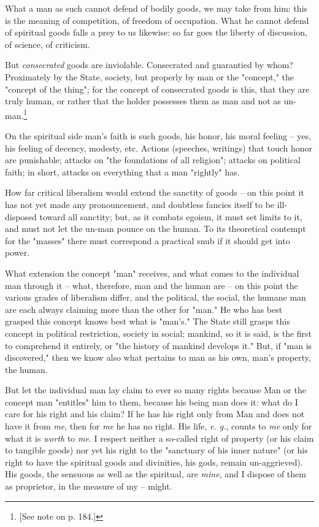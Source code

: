 What a man as such cannot defend of bodily goods, we may take from him: this 
is the meaning of competition, of freedom of occupation. What he cannot defend 
of spiritual goods falls a prey to us likewise: so far goes the liberty of 
discussion, of science, of criticism.

But \textit{consecrated} goods are inviolable. Consecrated and guarantied by 
whom? Proximately by the State, society, but properly by man or the 
"{}concept,"{} the "{}concept of the thing"{}; for the concept of consecrated 
goods is this, that they are truly human, or rather that the holder possesses 
them as man and not as un-man.\footnote{[See note on p. 184.]}

On the spiritual side man's faith is such goods, his honor, his moral feeling 
-- yes, his feeling of decency, modesty, etc. Actions (speeches, writings) 
that touch honor are punishable; attacks on "{}the foundations of all 
religion"{}; attacks on political faith; in short, attacks on everything that 
a man "{}rightly"{} has.

How far critical liberalism would extend the sanctity of goods -- on this 
point it has not yet made any pronouncement, and doubtless fancies itself to 
be ill-disposed toward all sanctity; but, as it combats egoism, it must set 
limits to it, and must not let the un-man pounce on the human. To its 
theoretical contempt for the "{}masses"{} there must correspond a practical 
snub if it should get into power.

What extension the concept "{}man"{} receives, and what comes to the 
individual man through it -- what, therefore, man and the human are -- on this 
point the various grades of liberalism differ, and the political, the social, 
the humane man are each always claiming more than the other for "{}man."{} He 
who has best grasped this concept knows best what is "{}man's."{} The State 
still grasps this concept in political restriction, society in social; 
mankind, so it is said, is the first to comprehend it entirely, or "{}the 
history of mankind develops it."{} But, if "{}man is discovered,"{} then we 
know also what pertains to man as his own, man's property, the human.

But let the individual man lay claim to ever so many rights because Man or the 
concept man "{}entitles"{} him to them, because his being man does it: what do 
I care for his right and his claim? If he has his right only from Man and does 
not have it from \textit{me}, then for \textit{me} he has no right. His life, 
\textit{e. g.}, counts to \textit{me} only for what it is \textit{worth} to 
\textit{me}. I respect neither a so-called right of property (or his claim to 
tangible goods) nor yet his right to the "{}sanctuary of his inner nature"{} 
(or his right to have the spiritual goods and divinities, his gods, remain 
un-aggrieved). His goods, the sensuous as well as the spiritual, are 
\textit{mine}, and I dispose of them as proprietor, in the measure of my -- 
might.

